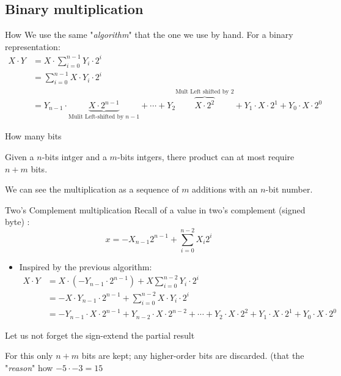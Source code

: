 \subsection{Binary multiplication}
\begin{parag}{How}
    We use the same "\textit{algorithm}" that the one we use by hand. For a binary representation:
    \begin{align*}
        X\cdot Y &= X \cdot \sum_{i=0}^{n-1} Y_i\cdot 2^i \\
        &= \sum_{i=0}^{n-1}X\cdot Y_i\cdot 2^i \\
        &= Y_{n-1} \cdot \underbrace{X \cdot 2^{n-1}}_{\text{Mulit Left-shifted by }n-1} + \cdots + Y_2\overbrace{X \cdot 2^2}^{\text{Mult Left shifted by }2} + Y_1\cdot X \cdot 2^1 + Y_0 \cdot X \cdot 2^0
    \end{align*}
\end{parag}
\begin{parag}{How many bits}
    \begin{theoreme}
        Given a $n$-bits intger and a $m$-bits intgers, there product can at most require $n + m$ bits.
    \end{theoreme}
    \begin{framedremark}
        We can see the multiplication as a sequence of $m$ additions with an $n$-bit number.
    \end{framedremark}
\end{parag}
\begin{parag}{Two's Complement multiplication}
    Recall of a value in two's complement (signed byte) : 
    \[x = -X_{n-1}2^{n-1} + \sum_{i = 0}^{n-2}X_i2^i\]
    \begin{itemize}
        \item Inspired by the previous algorithm:
        \begin{align*}
            X \cdot Y &= X \cdot (-Y_{n-1}\cdot 2^{n-1}) + X \sum_{i=0}^{n-2}Y_i\cdot 2^i \\
            &= -X\cdot Y_{n-1}\cdot 2^{n-1} + \sum_{i=0}^{n-2}X \cdot Y_i\cdot 2^i \\
            &= -Y_{n-1}\cdot X \cdot 2^{n-1} + Y_{n-2}\cdot X \cdot 2^{n-2} + \cdots + Y_2\cdot X\cdot 2^2 + Y_1\cdot X\cdot 2^1 + Y_0\cdot X\cdot 2^0
        \end{align*}
    \end{itemize}
    \begin{framedremark}
        Let us not forget the sign-extend the partial result
    \end{framedremark}
    For this only $n + m$ bits are kept; any higher-order bits are discarded. (that the "\textit{reason}" how $-5\cdot -3 = 15$
\end{parag}
